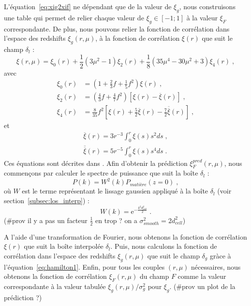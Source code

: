 \documentclass[11pt, twoside, a4paper, openright]{report}
\begin{document}
L'équation~\ref{eq:xig2xif} ne dépendant que de la valeur de $\xi_g$, nous construisons une table qui permet de relier chaque valeur de $\xi_g \in [-1 ; 1]$ à la valeur $\xi_F$ correspondante.
De plus, nous pouvons relier la fonction de corrélation dans l'espace des redshifts $\xi_g(r, \mu)$, à la fonction de corrélation $\xi(r)$ que suit le champ $\delta_l$ :
\begin{equation}
  \label{eq:hamilton1}
  \xi(r, \mu) = \xi_0(r) + \frac{1}{2}\left(3 \mu^2 - 1\right) \xi_2(r) + \frac{1}{8}\left(35 \mu^4 - 30 \mu^2 + 3\right) \xi_4(r) \; ,
\end{equation}
avec
\begin{align}
  \label{eq:hamilton2}
  \xi_0(r) &= \left(1 + \frac{2}{3} f + \frac{1}{5} f^2\right) \xi(r) \; , \\
  \xi_2(r) &= \left(\frac{4}{3} f + \frac{4}{7} f^2\right) \left[\xi(r) - \overline \xi(r)\right] \; , \\
  \xi_4(r) &= \frac{8}{35} f^2\left[\xi(r) + \frac{5}{2} \overline \xi(r) - \frac{7}{2} \overline{\overline \xi}(r)\right] \; ,
\end{align}
et
\begin{align}
  \label{eq:hamilton3}
  \overline \xi(r) = 3 r^{-3} \int_0^r \xi(s) s^2 ds \; , \\
  \overline{\overline \xi}(r) = 5 r^{-5} \int_0^r \xi(s) s^4 ds \; .
\end{align}
Ces équations sont décrites dans \citet{hamilton_measuring_1992}.
Afin d'obtenir la prédiction $\xi_F^{pred}(r, \mu)$, nous commençons par calculer  le spectre de puissance que suit la boîte $\delta_l$ :
\begin{equation}
  P(k) = W^2(k)P_{matière}(z=0) \; ,
\end{equation}
où $W$ est le terme représentant le lissage gaussien appliqué à la boîte $\delta_l$ (voir section~\ref{subsec:los_interp}) :
\begin{equation}
  W(k) = \mathrm{e}^{- \frac{k^2 d_{cell}^2}{2}} \;.
\end{equation}
(\#prov il y a pas un facteur $\frac{1}{2}$ en trop ? on a $\sigma_{smooth}^2 = 2 d_{cell}^2$)

A l'aide d'une transformation de Fourier, nous obtenons la fonction de corrélation $\xi(r)$ que suit la boîte interpolée $\delta_l$.
Puis, nous calculons la fonction de corrélation dans l'espace des redshifts $\xi_g(r, \mu)$ que suit le champ $\delta_g$ gràce à l'équation~\ref{eq:hamilton1}. Enfin, pour tous les couples $(r,\mu)$ nécessaires, nous obtenons la fonction de corrélation $\xi_F(r, \mu)$ du champ $F$ comme la valeur correspondante à la valeur tabulée $\xi_g(r, \mu) / \sigma_g^2$ pour $\xi_g$.
(\#prov un plot de la prédiction ?)
\end{document}
